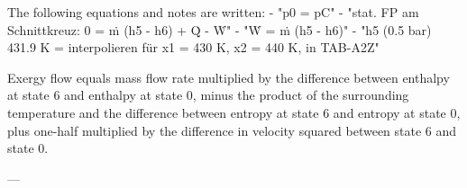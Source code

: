 The following equations and notes are written:  
- "p0 = pC"  
- "stat. FP am Schnittkreuz: 0 = ṁ (h5 - h6) + Q̇ - Ẇ"  
- "Ẇ = ṁ (h5 - h6)"  
- "h5 (0.5 bar) 431.9 K = interpolieren für x1 = 430 K, x2 = 440 K, in TAB-A2Z"

Exergy flow equals mass flow rate multiplied by the difference between enthalpy at state 6 and enthalpy at state 0, minus the product of the surrounding temperature and the difference between entropy at state 6 and entropy at state 0, plus one-half multiplied by the difference in velocity squared between state 6 and state 0.

---